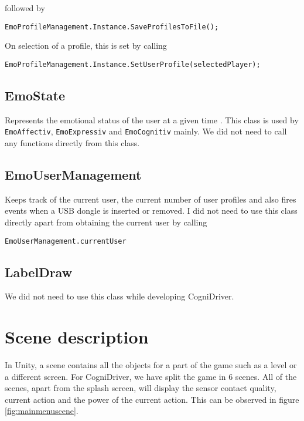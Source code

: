 followed by

\begin{Verbatim}[frame=single, framesep=3mm]
EmoProfileManagement.Instance.SaveProfilesToFile();
\end{Verbatim}

On selection of a profile, this is set by calling

\begin{Verbatim}[frame=single, framesep=3mm]
EmoProfileManagement.Instance.SetUserProfile(selectedPlayer);
\end{Verbatim}

\subsection{EmoState}
Represents the emotional status of the user at a given time \cite{emotivSDKUserManual}. This class is used by \texttt{EmoAffectiv}, \texttt{EmoExpressiv} and \texttt{EmoCognitiv} mainly. We did not need to call any functions directly from this class.

\subsection{EmoUserManagement}
Keeps track of the current user, the current number of user profiles and also fires events when a USB dongle is inserted or removed. I did not need to use this class directly apart from obtaining the current user by calling

\begin{Verbatim}[frame=single, framesep=3mm]
EmoUserManagement.currentUser
\end{Verbatim}

\subsection{LabelDraw}
We did not need to use this class while developing CogniDriver.

\section{Scene description}
In Unity, a scene contains all the objects for a part of the game such as a level or a different screen. For CogniDriver, we have split the game in 6 scenes. All of the scenes, apart from the splash screen, will display the sensor contact quality, current action and the power of the current action. This can be observed in figure \ref{fig:mainmenuscene}.

